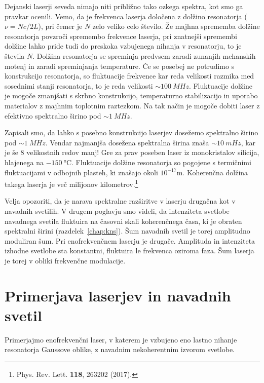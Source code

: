 Dejanski laserji seveda nimajo niti približno tako ozkega spektra, kot smo ga
pravkar ocenili. Vemo, da je frekvenca laserja določena z dolžino resonatorja 
($\nu=N c/2L$), pri čemer je $N$ zelo veliko celo število. Že majhna
sprememba dolžine resonatorja povzroči spremembo frekvence laserja, pri 
znatnejši spremembi dolžine lahko pride tudi do preskoka vzbujenega
nihanja v resonatorju, to je števila $N$. Dolžina resonatorja se 
spreminja predvsem zaradi zunanjih mehanskih motenj in zaradi spreminjanja
temperature. Če se posebej ne potrudimo s konstrukcijo resonatorja, so 
fluktuacije frekvence kar reda velikosti razmika med sosednimi stanji 
resonatorja, to je reda velikosti $\sim 100~\si{MHz}$. 
Fluktuacije dolžine je mogoče zmanjšati s skrbno konstrukcijo, 
temperaturno stabilizacijo in uporabo materialov z majhnim toplotnim raztezkom. 
Na tak način je mogoče dobiti laser z efektivno spektralno širino pod $\sim 1~\si{MHz}$.

\begin{remark}
Zapisali smo, da lahko s posebno konstrukcijo laserjev dosežemo
spektralno širino pod $\sim 1~\si{MHz}$. Vendar najmanjša dosežena spektralna širina
znaša $\sim 10~\si{mHz}$, kar je še 8 velikostnih redov manj! Gre za prav poseben 
laser iz monokristalov silicija, hlajenega na $-150~\si{\celsius}$. Fluktuacije
dolžine resonatorja so pogojene s termičnimi fluktuacijami v odbojnih plasteh, 
ki znašajo okoli $10^{-17}\si{\metre}$. Koherenčna dolžina takega laserja je več
milijonov kilometrov.\footnote{Phys. Rev. Lett. {\bf 118}, 263202 (2017).} 
\end{remark}

Velja opozoriti, da je narava spektralne razširitve v laserju 
drugačna kot v navadnih svetilih. V drugem poglavju smo videli, da 
intenziteta svetlobe navadnega svetila fluktuira na časovni skali 
koherenčnega časa, ki je obraten spektralni širini (razdelek~\ref{chap:kns}). 
Šum navadnih svetil je torej amplitudno moduliran šum. Pri 
enofrekvenčnem laserju je drugače. Amplituda in intenziteta 
izhodne svetlobe sta konstantni, fluktuira le frekvenca oziroma
faza. Šum laserja je torej v obliki frekvenčne modulacije.

\section{Primerjava laserjev in navadnih svetil}
Primerjajmo enofrekvenčni laser, v katerem je vzbujeno eno lastno nihanje
resonatorja Gaussove oblike, z navadnim nekoherentnim izvorom svetlobe.

